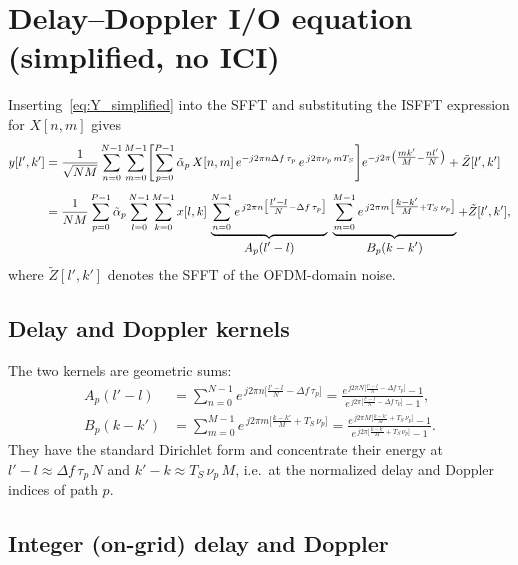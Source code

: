 \documentclass[11pt]{article}
\begin{document}
\section*{Delay--Doppler I/O equation (simplified, no ICI)}

Inserting~\eqref{eq:Y_simplified} into the SFFT and substituting the ISFFT
expression for \(X[n,m]\) gives
\begin{align}
y[l',k']
&= \frac{1}{\sqrt{NM}}\sum_{n=0}^{N-1}\sum_{m=0}^{M-1}
   \Biggl[
     \sum_{p=0}^{P-1} \tilde{\alpha}_p\, X[n,m]\,
     e^{-j2\pi n\Delta f\, \tau_p}\,
     e^{\,j2\pi \nu_p\, mT_S}
   \Biggr]
   e^{-j2\pi\bigl(\tfrac{mk'}{M} - \tfrac{nl'}{N}\bigr)} + \tilde{Z}[l',k']
   \notag\\[4pt]
&= \frac{1}{NM}\sum_{p=0}^{P-1}\tilde{\alpha}_p
   \sum_{l=0}^{N-1}\sum_{k=0}^{M-1} x[l,k]\,
   \underbrace{\sum_{n=0}^{N-1}
        e^{\,j2\pi n\bigl[\tfrac{l'-l}{N} - \Delta f\,\tau_p\bigr]}
   }_{\displaystyle A_p(l'-l)}\;
   \underbrace{\sum_{m=0}^{M-1}
        e^{\,j2\pi m\bigl[\tfrac{k-k'}{M} + T_S\,\nu_p\bigr]}
   }_{\displaystyle B_p(k-k')}
   + \tilde{Z}[l',k'],
\label{eq:OTFS_IO_general}
\end{align}
where \(\tilde{Z}[l',k']\) denotes the SFFT of the OFDM-domain noise.

\subsection*{Delay and Doppler kernels}

The two kernels are geometric sums:
\begin{align}
A_p(l'-l) &= \sum_{n=0}^{N-1}
             e^{\,j2\pi n\bigl[\tfrac{l'-l}{N} - \Delta f\,\tau_p\bigr]}
           = \frac{e^{\,j2\pi N\bigl[\tfrac{l'-l}{N} - \Delta f\,\tau_p\bigr]} - 1}
                  {e^{\,j2\pi \bigl[\tfrac{l'-l}{N} - \Delta f\,\tau_p\bigr]} - 1}, \\
B_p(k-k') &= \sum_{m=0}^{M-1}
             e^{\,j2\pi m\bigl[\tfrac{k-k'}{M} + T_S\,\nu_p\bigr]}
           = \frac{e^{\,j2\pi M\bigl[\tfrac{k-k'}{M} + T_S\,\nu_p\bigr]} - 1}
                  {e^{\,j2\pi \bigl[\tfrac{k-k'}{M} + T_S\,\nu_p\bigr]} - 1}.
\end{align}
They have the standard Dirichlet form and concentrate their energy at
\(l'-l \approx \Delta f\,\tau_p\, N\) and \(k'-k \approx T_S\,\nu_p\, M\),
i.e.\ at the normalized delay and Doppler indices of path \(p\).

\subsection*{Integer (on-grid) delay and Doppler}
\end{document}
